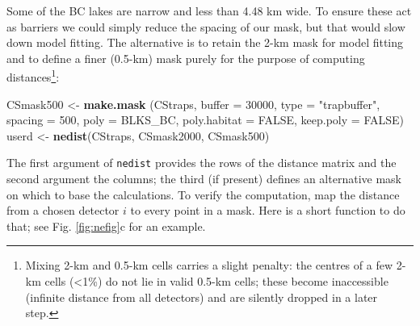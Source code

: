 \documentclass[
]{book}
\newenvironment{Shaded}{\begin{snugshade}}{\end{snugshade}}
\newcommand{\AttributeTok}[1]{\textcolor[rgb]{0.13,0.29,0.53}{#1}}
\newcommand{\ConstantTok}[1]{\textcolor[rgb]{0.56,0.35,0.01}{#1}}
\newcommand{\DecValTok}[1]{\textcolor[rgb]{0.00,0.00,0.81}{#1}}
\newcommand{\FunctionTok}[1]{\textcolor[rgb]{0.13,0.29,0.53}{\textbf{#1}}}
\newcommand{\NormalTok}[1]{#1}
\newcommand{\OtherTok}[1]{\textcolor[rgb]{0.56,0.35,0.01}{#1}}
\newcommand{\StringTok}[1]{\textcolor[rgb]{0.31,0.60,0.02}{#1}}
\begin{document}
Some of the BC lakes are narrow and less than 4.48 km wide. To ensure these act as barriers we could simply reduce the spacing of our mask, but that would slow down model fitting. The alternative is to retain the 2-km mask for model fitting and to define a finer (0.5-km) mask purely for the purpose of computing distances\footnote{Mixing 2-km and 0.5-km cells carries a slight penalty: the centres of a few 2-km cells (\textless1\%) do not lie in valid 0.5-km cells; these become inaccessible (infinite distance from all detectors) and are silently dropped in a later step.}:

\begin{Shaded}
\begin{Highlighting}[]
\NormalTok{CSmask500 }\OtherTok{\textless{}{-}} \FunctionTok{make.mask}\NormalTok{ (CStraps, }\AttributeTok{buffer =} \DecValTok{30000}\NormalTok{, }\AttributeTok{type =} 
    \StringTok{"trapbuffer"}\NormalTok{, }\AttributeTok{spacing =} \DecValTok{500}\NormalTok{, }\AttributeTok{poly =}\NormalTok{ BLKS\_BC, }\AttributeTok{poly.habitat =}
     \ConstantTok{FALSE}\NormalTok{, }\AttributeTok{keep.poly =} \ConstantTok{FALSE}\NormalTok{)}
\NormalTok{userd }\OtherTok{\textless{}{-}} \FunctionTok{nedist}\NormalTok{(CStraps, CSmask2000, CSmask500)}
\end{Highlighting}
\end{Shaded}

The first argument of \texttt{nedist} provides the rows of the distance matrix and the second argument the columns; the third (if present) defines an alternative mask on which to base the calculations. To verify the computation, map the distance from a chosen detector \(i\) to every point in a mask. Here is a short function to do that; see Fig. \ref{fig:nefig}c for an example.
\end{document}
